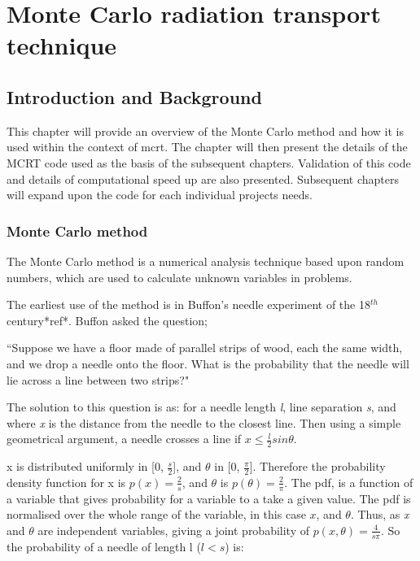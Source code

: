 \chapter{Monte Carlo radiation transport technique}

\section{Introduction and Background}
This chapter will provide an overview of the Monte Carlo method and how it is used within the context of \gls{mcrt}. The chapter will then present the details of the MCRT code used as the basis of the subsequent chapters. Validation of this code and details of computational speed up are also presented. Subsequent chapters will expand upon the code for each individual projects needs.

\subsection{Monte Carlo method}
The Monte Carlo method is a numerical analysis technique based upon random numbers, which are used to calculate unknown variables in problems. 

The earliest use of the method is in Buffon's needle experiment of the 18$^{th}$ century*ref*. Buffon asked the question;


``Suppose we have a floor made of parallel strips of wood, each the same width, and we drop a needle onto the floor. What is the probability that the needle will lie across a line between two strips?"


The solution to this question is as:
for a needle length \textit{l}, line separation \textit{s}, and where \textit{x} is the distance from the needle to the closest line. Then using a simple geometrical argument, a needle crosses a line if $x \leq \tfrac{l}{2} sin \theta$.

x is distributed uniformly in [0, $\tfrac{s}{2}$], and $\theta$ in [0, $\tfrac{\pi}{2}$]. Therefore the probability density function for x is $p(x)=\tfrac{2}{s}$, and $\theta$ is $p(\theta) = \tfrac{2}{\pi}$. The \gls{pdf}, is a function of a variable that gives probability for a variable to a take a given value. The \gls{pdf} is normalised over the whole range of the variable, in this case $x$, and $\theta$.
Thus, as \textit{x} and $\theta$ are independent variables, giving a joint probability of $p(x,\theta) = \tfrac{4}{s \pi}$.
So the probability of a needle of length l ($l<s$) is:

